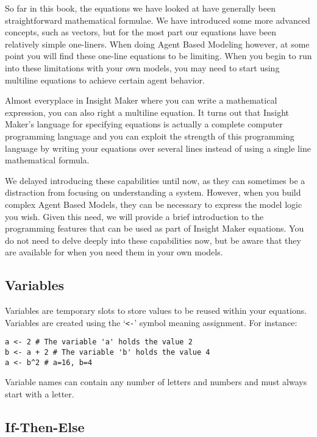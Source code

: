 \documentclass[]{memoir}
\begin{document}
So far in this book, the equations we have looked at have generally been
straightforward mathematical formulae. We have introduced some more
advanced concepts, such as vectors, but for the most part our equations
have been relatively simple one-liners. When doing Agent Based Modeling
however, at some point you will find these one-line equations to be
limiting. When you begin to run into these limitations with your own
models, you may need to start using multiline equations to achieve
certain agent behavior.

Almost everyplace in Insight Maker where you can write a mathematical
expression, you can also right a multiline equation. It turns out that
Insight Maker's language for specifying equations is actually a complete
computer programming language and you can exploit the strength of this
programming language by writing your equations over several lines
instead of using a single line mathematical formula.

We delayed introducing these capabilities until now, as they can
sometimes be a distraction from focusing on understanding a system.
However, when you build complex Agent Based Models, they can be
necessary to express the model logic you wish. Given this need, we will
provide a brief introduction to the programming features that can be
used as part of Insight Maker equations. You do not need to delve deeply
into these capabilities now, but be aware that they are available for
when you need them in your own models.

\subsection{Variables}

Variables are temporary slots to store values to be reused within your
equations. Variables are created using the `\lstinline!<-!' symbol
meaning assignment. For instance:

\begin{lstlisting}
a <- 2 # The variable 'a' holds the value 2
b <- a + 2 # The variable 'b' holds the value 4
a <- b^2 # a=16, b=4
\end{lstlisting}

Variable names can contain any number of letters and numbers and must
always start with a letter.

\subsection{If-Then-Else}
\end{document}
